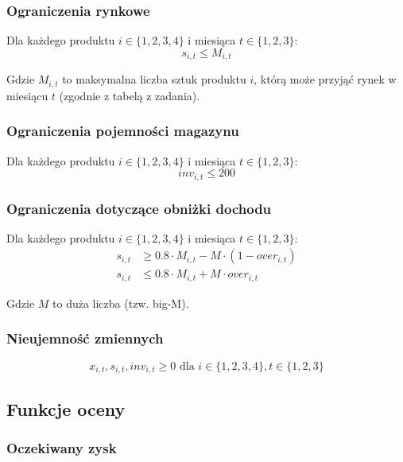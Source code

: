 \documentclass[12pt]{article}
\begin{document}
\subsubsection{Ograniczenia rynkowe}

Dla każdego produktu $i \in \{1,2,3,4\}$ i miesiąca $t \in \{1,2,3\}$:
\begin{equation}
s_{i,t} \leq M_{i,t}
\end{equation}

Gdzie $M_{i,t}$ to maksymalna liczba sztuk produktu $i$, którą może przyjąć rynek w miesiącu $t$ (zgodnie z tabelą z zadania).

\subsubsection{Ograniczenia pojemności magazynu}

Dla każdego produktu $i \in \{1,2,3,4\}$ i miesiąca $t \in \{1,2,3\}$:
\begin{equation}
inv_{i,t} \leq 200
\end{equation}

\subsubsection{Ograniczenia dotyczące obniżki dochodu}

Dla każdego produktu $i \in \{1,2,3,4\}$ i miesiąca $t \in \{1,2,3\}$:
\begin{align}
s_{i,t} &\geq 0.8 \cdot M_{i,t} - M \cdot (1 - over_{i,t}) \\
s_{i,t} &\leq 0.8 \cdot M_{i,t} + M \cdot over_{i,t}
\end{align}

Gdzie $M$ to duża liczba (tzw. big-M).

\subsubsection{Nieujemność zmiennych}

\begin{equation}
x_{i,t}, s_{i,t}, inv_{i,t} \geq 0 \text{ dla } i \in \{1,2,3,4\}, t \in \{1,2,3\}
\end{equation}

\subsection{Funkcje oceny}

\subsubsection{Oczekiwany zysk}
\end{document}

